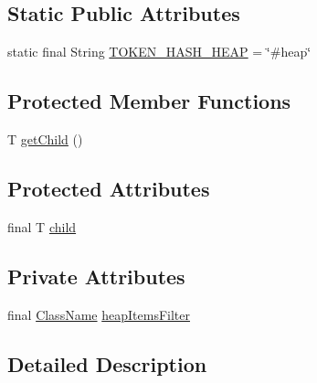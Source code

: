 \subsection*{Static Public Attributes}
\begin{DoxyCompactItemize}
\item 
static final String \hyperlink{classgov_1_1nasa_1_1jpf_1_1inspector_1_1server_1_1expression_1_1expressions_1_1_expression_state_heap_entry_list_af7ffb3ee68ccbfc30c198ff37a6d3a6f}{T\+O\+K\+E\+N\+\_\+\+H\+A\+S\+H\+\_\+\+H\+E\+AP} = \char`\"{}\#heap\char`\"{}
\end{DoxyCompactItemize}
\subsection*{Protected Member Functions}
\begin{DoxyCompactItemize}
\item 
T \hyperlink{classgov_1_1nasa_1_1jpf_1_1inspector_1_1server_1_1expression_1_1_expression_state_unary_operator_a150bac338d6557f79ca185d3f6ad6e06}{get\+Child} ()
\end{DoxyCompactItemize}
\subsection*{Protected Attributes}
\begin{DoxyCompactItemize}
\item 
final T \hyperlink{classgov_1_1nasa_1_1jpf_1_1inspector_1_1server_1_1expression_1_1_expression_state_unary_operator_a66041b1f569a361549e28a00f7ca5f2f}{child}
\end{DoxyCompactItemize}
\subsection*{Private Attributes}
\begin{DoxyCompactItemize}
\item 
final \hyperlink{classgov_1_1nasa_1_1jpf_1_1inspector_1_1utils_1_1expressions_1_1_class_name}{Class\+Name} \hyperlink{classgov_1_1nasa_1_1jpf_1_1inspector_1_1server_1_1expression_1_1expressions_1_1_expression_state_heap_entry_list_a6c9bd3b9580253d35d991a00a8a5c2e8}{heap\+Items\+Filter}
\end{DoxyCompactItemize}


\subsection{Detailed Description}


